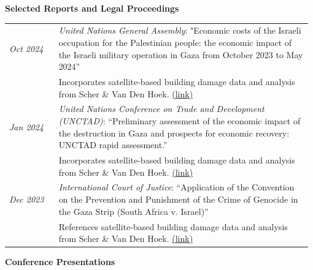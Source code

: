 \documentclass[letterpaper,11pt,oneside]{article}
\newcommand{\datefmt}[1]{\textit{#1}}
\begin{document}
\begin{flushleft}\textbf{Selected Reports and Legal Proceedings}\end{flushleft}
\vspace{-4ex}
\begin{longtable}{@{}p{0.16\linewidth}p{0.82\linewidth}@{}}

\datefmt{Oct 2024} & \textit{United Nations General Assembly}: "Economic costs of the Israeli occupation for the Palestinian people: the economic impact of the Israeli military operation in Gaza from October 2023 to May 2024” \\
& Incorporates satellite-based building damage data and analysis from Scher \& Van Den Hoek. \href{https://documents.un.org/doc/undoc/gen/n24/260/74/pdf/n2426074.pdf}{(link)}\\[1.0ex]

\datefmt{Jan 2024} & \textit{United Nations Conference on Trade and Development (UNCTAD)}: “Preliminary assessment of the economic impact of the destruction in Gaza and prospects for economic recovery: UNCTAD rapid assessment.” \\
& Incorporates satellite-based building damage data and analysis from Scher \& Van Den Hoek. \href{https://unctad.org/publication/preliminary-assessment-economic-impact-destruction-gaza-and-prospects-economic-recovery}{(link)}\\[1.0ex]

\datefmt{Dec 2023} & \textit{International Court of Justice}: “Application of the Convention on the Prevention and Punishment of the Crime of Genocide in the Gaza Strip (South Africa v. Israel)” \\
& References satellite-based building damage data and analysis from Scher \& Van Den Hoek. \href{https://unctad.org/publication/preliminary-assessment-economic-impact-destruction-gaza-and-prospects-economic-recovery}{(link)}\\[1.0ex]

\end{longtable}
\vspace{-4ex}
\begin{flushleft}\textbf{\Large{Conference Presentations}}\end{flushleft}
\vspace{-4ex}
\end{document}
